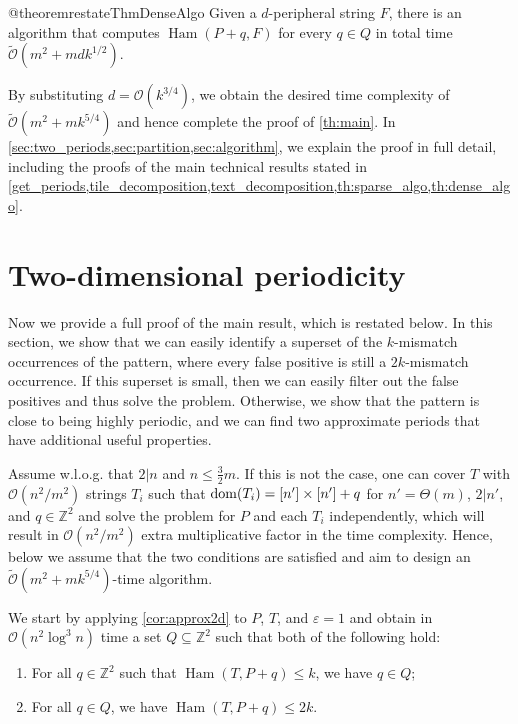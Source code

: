 \documentclass[twoside,leqno]{article}
\newcommand{\Z}{\mathbb{Z}}
\renewcommand{\O}{\mathcal{O}}
\newcommand{\tO}{\tilde{\mathcal{O}}}
\DeclareMathOperator*{\Ham}{Ham}
\begin{document}
\begin{restatable*}{@theorem}{restateThmDenseAlgo}
\label{th:dense_algo}
Given a $d$-peripheral string $F$, there is an algorithm that computes $\Ham(P + q, F)$ for every $q \in Q$ in total time $\tO(m^2 + mdk^{1/2})$.
\end{restatable*}

By substituting $d = \O(k^{3/4})$, we obtain the desired time complexity of $\tO(m^2 + mk^{5/4})$ and hence complete the proof of \cref{th:main}.
In \cref{sec:two_periods,sec:partition,sec:algorithm}, we explain the proof in full detail, including the proofs of the main technical results stated in \cref{get_periods,tile_decomposition,text_decomposition,th:sparse_algo,th:dense_algo}.


\section{Two-dimensional periodicity}
\label{sec:two_periods}


Now we provide a full proof of the main result, which is restated below. In this section, we show that we can easily identify a superset of the $k$-mismatch occurrences of the pattern, where every false positive is still a $2k$-mismatch occurrence. If this superset is small, then we can easily filter out the false positives and thus solve the problem. Otherwise, we show that the pattern is close to being highly periodic, and we can find two approximate periods that have additional useful properties.

\restateThmMain*


Assume w.l.o.g. that $2|n$ and $n \le \frac{3}{2}m$. If this is not the case, one can cover $T$ with $\O(n^2/m^2)$ strings $T_i$ such that $\operatorname*{dom}(T_i) = [n'] \times [n'] + q$ for $n' = \Theta(m)$, $2|n'$, and $q \in \Z^2$ and solve the problem for $P$ and each $T_i$ independently, which will result in $\O(n^2/m^2)$ extra multiplicative factor in the time complexity. Hence, below we assume that the two conditions are satisfied and aim to design an $\tO(m^2 + mk^{5/4})$-time algorithm. 

We start by applying \cref{cor:approx2d} to $P$, $T$, and $\varepsilon = 1$ and obtain in $\O(n^2 \log^3 n)$ time a set $Q \subseteq \Z^2$ such that both of the following hold:
\begin{enumerate}
\item For all $q \in \Z^2$ such that $\Ham(T, P+q) \le k$, we have $q \in Q$;
\item For all $q \in Q$, we have $\Ham(T, P+q) \le 2 k$.
\end{enumerate}
\end{document}
